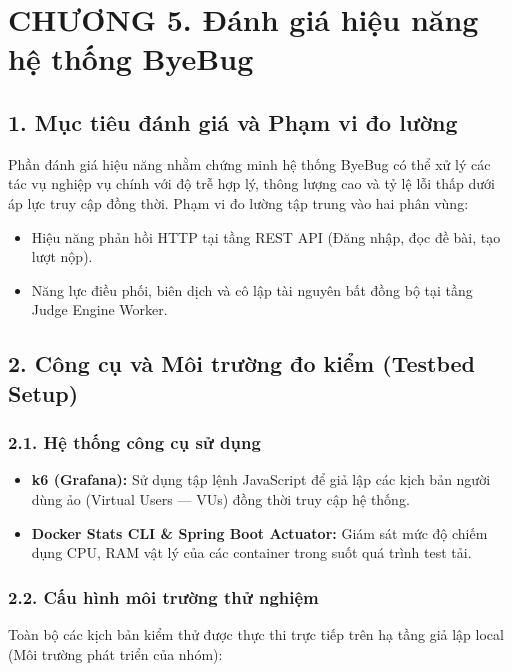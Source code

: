 \documentclass[12pt,a4paper]{article}
\renewcommand{\_}{\BreakableUnderscore}
\providecommand{\tightlist}{%
  \setlength{\itemsep}{0pt}\setlength{\parskip}{0pt}}
\begin{document}
\newpage

\section{CHƯƠNG 5. Đánh giá hiệu năng hệ thống ByeBug}

\subsection{1. Mục tiêu đánh giá và Phạm vi đo lường}

Phần đánh giá hiệu năng nhằm chứng minh hệ thống ByeBug có thể xử lý các tác vụ nghiệp vụ chính với độ trễ hợp lý, thông lượng cao và tỷ lệ lỗi thấp dưới áp lực truy cập đồng thời. Phạm vi đo lường tập trung vào hai phân vùng:

\begin{itemize}
\tightlist
\item
  Hiệu năng phản hồi HTTP tại tầng REST API (Đăng nhập, đọc đề bài, tạo lượt nộp).
\item
  Năng lực điều phối, biên dịch và cô lập tài nguyên bất đồng bộ tại tầng Judge Engine Worker.
\end{itemize}

\subsection{2. Công cụ và Môi trường đo kiểm (Testbed Setup)}

\subsubsection{2.1. Hệ thống công cụ sử dụng}

\begin{itemize}
\tightlist
\item
  \textbf{k6 (Grafana):} Sử dụng tập lệnh JavaScript để giả lập các kịch bản người dùng ảo (Virtual Users --- VUs) đồng thời truy cập hệ thống.
\item
  \textbf{Docker Stats CLI \& Spring Boot Actuator:} Giám sát mức độ chiếm dụng CPU, RAM vật lý của các container trong suốt quá trình test tải.
\end{itemize}

\subsubsection{2.2. Cấu hình môi trường thử nghiệm}

Toàn bộ các kịch bản kiểm thử được thực thi trực tiếp trên hạ tầng giả lập local (Môi trường phát triển của nhóm):
\end{document}
